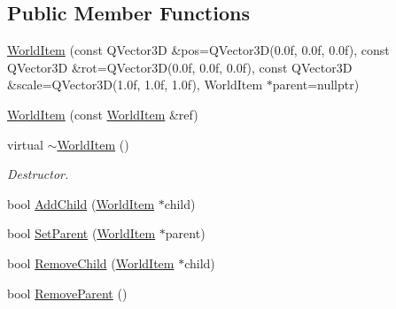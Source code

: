 \subsection*{Public Member Functions}
\begin{DoxyCompactItemize}
\item 
\mbox{\hyperlink{class_geometry_engine_1_1_geometry_world_item_1_1_world_item_aff1363b5a1dba5557b3d1a07f81829aa}{World\+Item}} (const Q\+Vector3D \&pos=Q\+Vector3D(0.\+0f, 0.\+0f, 0.\+0f), const Q\+Vector3\+D \&rot=\+Q\+Vector3\+D(0.\+0f, 0.\+0f, 0.\+0f), const Q\+Vector3\+D \&scale=\+Q\+Vector3\+D(1.\+0f, 1.\+0f, 1.\+0f), World\+Item $\ast$parent=nullptr)
\item 
\mbox{\hyperlink{class_geometry_engine_1_1_geometry_world_item_1_1_world_item_a3d32026ae29b40588fb8497df126ce6d}{World\+Item}} (const \mbox{\hyperlink{class_geometry_engine_1_1_geometry_world_item_1_1_world_item}{World\+Item}} \&ref)
\item 
\mbox{\label{class_geometry_engine_1_1_geometry_world_item_1_1_world_item_a9612ae6e4a06e258ba935813fb6f31ac}} 
virtual \mbox{\hyperlink{class_geometry_engine_1_1_geometry_world_item_1_1_world_item_a9612ae6e4a06e258ba935813fb6f31ac}{$\sim$\+World\+Item}} ()
\begin{DoxyCompactList}\small\item\em Destructor. \end{DoxyCompactList}\item 
bool \mbox{\hyperlink{class_geometry_engine_1_1_geometry_world_item_1_1_world_item_aa66f97360029dfc268a16a9f248be74a}{Add\+Child}} (\mbox{\hyperlink{class_geometry_engine_1_1_geometry_world_item_1_1_world_item}{World\+Item}} $\ast$child)
\item 
bool \mbox{\hyperlink{class_geometry_engine_1_1_geometry_world_item_1_1_world_item_acb8c065c43621ce13f95205129a1d686}{Set\+Parent}} (\mbox{\hyperlink{class_geometry_engine_1_1_geometry_world_item_1_1_world_item}{World\+Item}} $\ast$parent)
\item 
bool \mbox{\hyperlink{class_geometry_engine_1_1_geometry_world_item_1_1_world_item_a7d73575daa22395164123b26d514f42a}{Remove\+Child}} (\mbox{\hyperlink{class_geometry_engine_1_1_geometry_world_item_1_1_world_item}{World\+Item}} $\ast$child)
\item 
bool \mbox{\hyperlink{class_geometry_engine_1_1_geometry_world_item_1_1_world_item_a3e77ca882db0fe70315921af492ebef8}{Remove\+Parent}} ()

\end{DoxyCompactItemize}
